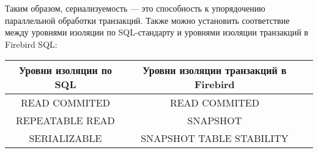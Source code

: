 Таким образом, сериализуемость --- это способность к  упорядочению параллельной обработки транзакций. Также можно установить соответствие между уровнями изоляции по SQL-стандарту и уровнями изоляции транзакций в Firebird SQL: 

\begin{table}[H]
	\centering
	\begin{tabular}{|c|c|c|}
		\hline \textbf{Уровни изоляции по SQL} & \textbf{Уровни изоляции транзакций в Firebird}    \\
		\hline READ COMMITED               & READ COMMITED                          \\
		\hline REPEATABLE READ             & SNAPSHOT                               \\
		\hline SERIALIZABLE                & SNAPSHOT TABLE STABILITY               \\
		\hline		
	\end{tabular}
\end{table}